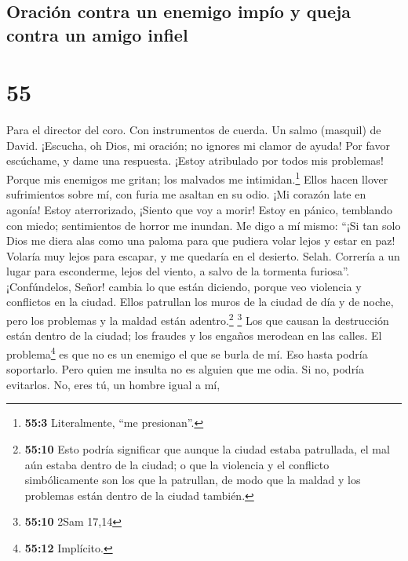 \hypertarget{oraciuxf3n-contra-un-enemigo-impuxedo-y-queja-contra-un-amigo-infiel}{%
\subsection{Oración contra un enemigo impío y queja contra un amigo
infiel}\label{oraciuxf3n-contra-un-enemigo-impuxedo-y-queja-contra-un-amigo-infiel}}

\hypertarget{section-54}{%
\section{55}\label{section-54}}

Para el director del coro. Con instrumentos de cuerda. Un salmo
(masquil) de David.  ¡Escucha, oh Dios, mi oración; no
ignores mi clamor de ayuda!  Por favor escúchame, y dame
una respuesta. ¡Estoy atribulado por todos mis problemas! 
Porque mis enemigos me gritan; los malvados me intimidan.\footnote{\textbf{55:3}
  Literalmente, ``me presionan''.} Ellos hacen llover sufrimientos sobre
mí, con furia me asaltan en su odio.  ¡Mi corazón late en
agonía! Estoy aterrorizado, ¡Siento que voy a morir! 
Estoy en pánico, temblando con miedo; sentimientos de horror me inundan.
 Me digo a mí mismo: ``¡Si tan solo Dios me diera alas
como una paloma para que pudiera volar lejos y estar en paz!
 Volaría muy lejos para escapar, y me quedaría en el
desierto. Selah.  Correría a un lugar para esconderme,
lejos del viento, a salvo de la tormenta furiosa''. 
¡Confúndelos, Señor! cambia lo que están diciendo, porque veo violencia
y conflictos en la ciudad.  Ellos patrullan los muros de
la ciudad de día y de noche, pero los problemas y la maldad están
adentro.\footnote{\textbf{55:10} Esto podría significar que aunque la
  ciudad estaba patrullada, el mal aún estaba dentro de la ciudad; o que
  la violencia y el conflicto simbólicamente son los que la patrullan,
  de modo que la maldad y los problemas están dentro de la ciudad
  también.} \footnote{\textbf{55:10} 2Sam 17,14}  Los que
causan la destrucción están dentro de la ciudad; los fraudes y los
engaños merodean en las calles.  El problema\footnote{\textbf{55:12}
  Implícito.} es que no es un enemigo el que se burla de mí. Eso hasta
podría soportarlo. Pero quien me insulta no es alguien que me odia. Si
no, podría evitarlos.  No, eres tú, un hombre igual a mí,
